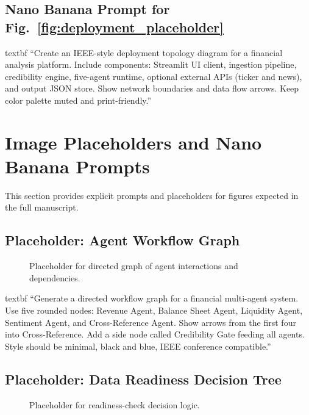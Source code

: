 \documentclass[conference]{IEEEtran}
\begin{document}
\subsection{Nano Banana Prompt for Fig.~\ref{fig:deployment_placeholder}}
\csname textbf ``Create an IEEE-style deployment topology diagram for a financial analysis platform. Include components: Streamlit UI client, ingestion pipeline, credibility engine, five-agent runtime, optional external APIs (ticker and news), and output JSON store. Show network boundaries and data flow arrows. Keep color palette muted and print-friendly.''

\section{Image Placeholders and Nano Banana Prompts}
This section provides explicit prompts and placeholders for figures expected in the full manuscript.

\subsection{Placeholder: Agent Workflow Graph}
\begin{figure}[t]
\centering
{}
\caption{Placeholder for directed graph of agent interactions and dependencies.}
\label{fig:agent_graph_placeholder}
\end{figure}

\csname textbf ``Generate a directed workflow graph for a financial multi-agent system. Use five rounded nodes: Revenue Agent, Balance Sheet Agent, Liquidity Agent, Sentiment Agent, and Cross-Reference Agent. Show arrows from the first four into Cross-Reference. Add a side node called Credibility Gate feeding all agents. Style should be minimal, black and blue, IEEE conference compatible.''

\subsection{Placeholder: Data Readiness Decision Tree}
\begin{figure}[t]
\centering
{}
\caption{Placeholder for readiness-check decision logic.}
\label{fig:readiness_placeholder}
\end{figure}
\end{document}
